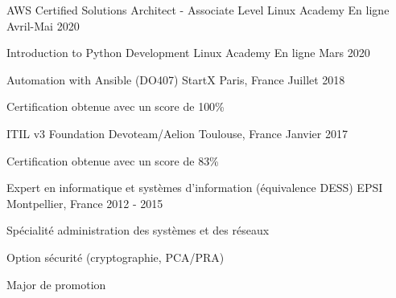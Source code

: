 

\begin{cventries}

  \cventry
    {AWS Certified Solutions Architect - Associate Level} %
    {Linux Academy} %
    {En ligne} %
    {Avril-Mai 2020} %
    {}

  \cventry
    {Introduction to Python Development} %
    {Linux Academy} %
    {En ligne} %
    {Mars 2020} %
    {}

  \cventry
    {Automation with Ansible (DO407)} %
    {StartX} %
    {Paris, France} %
    {Juillet 2018} %
    {
      \begin{cvitems} %
        \item {Certification obtenue avec un score de 100\%}
      \end{cvitems}
    }

  \cventry
    {ITIL v3 Foundation} %
    {Devoteam/Aelion} %
    {Toulouse, France} %
    {Janvier 2017} %
    {
      \begin{cvitems} %
        \item {Certification obtenue avec un score de 83\%}
      \end{cvitems}
    }

  \cventry
    {Expert en informatique et systèmes d'information (équivalence DESS)} %
    {EPSI} %
    {Montpellier, France} %
    {2012 - 2015} %
    {
      \begin{cvitems} %
        \item {Spécialité administration des systèmes et des réseaux}
        \item {Option sécurité (cryptographie, PCA/PRA)}
        \item {Major de promotion}
      \end{cvitems}
    }


\end{cventries}
